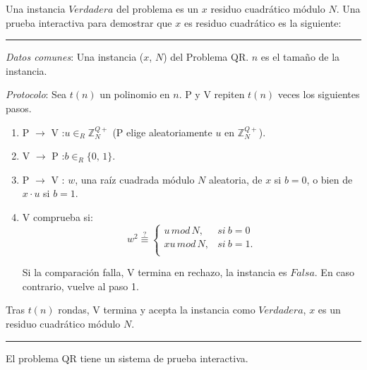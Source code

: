 \hfil

Una instancia $Verdadera$ del problema es un $x$ residuo cuadrático módulo $N$. Una prueba interactiva para demostrar que $x$ es residuo cuadrático es la siguiente:

\hfil

\rule{\textwidth}{1pt}
\begin{algorithm}
	
	\hfil
	
	\textit{Datos comunes}: Una instancia ($x$, $N$) del Problema QR. $n$ es el tamaño de la instancia.
	
	\textit{Protocolo}: Sea $t(n)$ un polinomio en $n$. P y V repiten $t(n)$ veces los siguientes pasos.
	
	\begin{enumerate}
		
		\item P $\rightarrow$ V :\quad $u \in_R \mathbb{Z}^{Q+}_N$ \quad (P elige aleatoriamente $u$ en $\mathbb{Z}^{Q+}_N$).
		
		\item V $\rightarrow$ P :\quad $b \in_R \{0,\,1\}$.
		
		\item P $\rightarrow$ V :\; $w$,\; una raíz cuadrada módulo $N$ aleatoria, de $x$ si $b=0$, o bien de $x\cdot u$ si $b=1$.
		
		\item V comprueba si:
		\[
			w^2 \overset{?}{\equiv}
			\begin{cases}
				u\, mod\, N, & si\ b = 0\\
				xu\, mod\, N, & si\ b = 1.\\
			\end{cases}
		\]
		
		Si la comparación falla, V termina en rechazo, la instancia es $Falsa$. En caso contrario, vuelve al paso 1.
		
		
	\end{enumerate}

	Tras $t(n)$ rondas, V termina y acepta la instancia como $Verdadera$, $x$ es un residuo cuadrático módulo $N$.
	
	\label{QRinteractive:alg}
\end{algorithm}
\rule{\textwidth}{1pt}

\hfil


\begin{theorem}
	El problema QR tiene un sistema de prueba interactiva.
\end{theorem}

